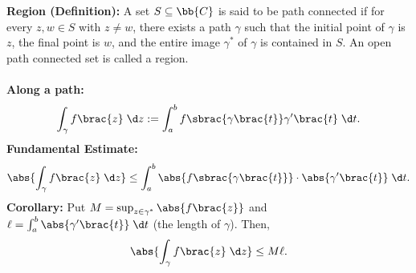 \documentclass[1pt]{article}
\begin{document}
\textbf{Region (Definition):} A set $S \subseteq \bb{C}$ is said to be path connected if for every $z,w \in S$ with $z \neq w$, 
there exists a path $\gamma$ such that the initial point of $\gamma$ is $z$, the final point is $w$, and the entire image $\gamma^*$ of $\gamma$
is contained in $S$. An open path connected set is called a region.
\\
\\ \textbf{Along a path:}
$$\int_{\gamma} f\brac{z} \; \d z := \int_{a}^{b} f\sbrac{\gamma\brac{t}}\gamma'\brac{t} \; \d t.$$
\textbf{Fundamental Estimate:} 
$$\abs{\int_{\gamma} f\brac{z} \; \d z} \leq \int_a^b \abs{f\sbrac{\gamma\brac{t}}} \cdot \abs{\gamma'\brac{t}} \; \d t.$$
\textbf{Corollary:} Put $M = \sup_{z \in \gamma^*}\abs{f\brac{z}}$ and $\ell = \int_a^b \abs{\gamma'\brac{t}} \; \d t$ (the length
of $\gamma$). Then,
$$\abs{\int_\gamma f\brac{z} \; \d z} \leq M\ell.$$
\end{document}
